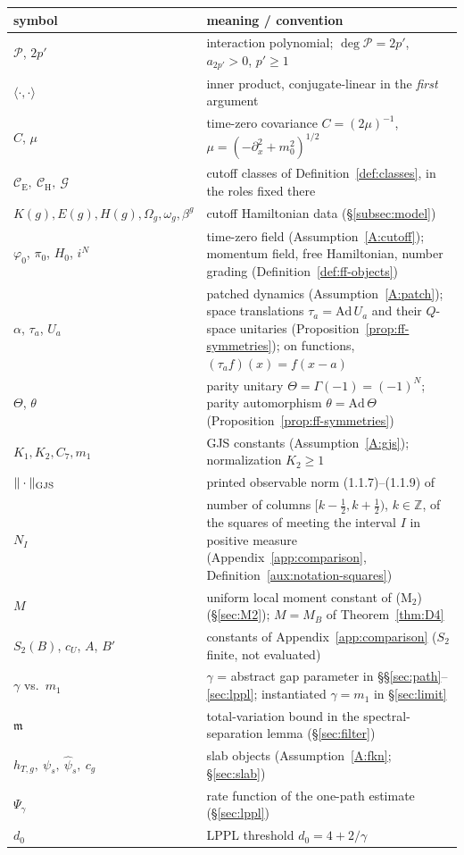 \documentclass[11pt,a4paper]{article}
\theoremstyle{plain}
\theoremstyle{definition}
\theoremstyle{plain}
\theoremstyle{definition}
\newcommand{\Z}{\mathbb{Z}}
\newcommand{\G}{\mathcal{G}}
\newcommand{\CE}{\mathcal{C}_{\mathrm E}}
\newcommand{\CH}{\mathcal{C}_{\mathrm H}}
\newcommand{\Om}{\Omega}
\newcommand{\ip}[2]{\langle #1,#2\rangle}
\begin{document}
\begin{center}
\small
\begin{tabular}{l p{}}
\toprule
symbol & meaning / convention\\
\midrule
$\mathscr P$, $2p'$ & interaction polynomial; $\deg\mathscr P=2p'$, $a_{2p'}>0$, $p'\ge1$\\
$\ip{\cdot}{\cdot}$ & inner product, conjugate-linear in the \emph{first} argument\\
$C$, $\mu$ & time-zero covariance $C=(2\mu)^{-1}$, $\mu=(-\partial_x^2+m_0^2)^{1/2}$\\
$\CE,\ \CH,\ \G$ & cutoff classes of Definition~\ref{def:classes}, in the roles fixed there\\
$K(g),E(g),H(g),\Om_g,\omega_g,\beta^g$ & cutoff Hamiltonian data (\S\ref{subsec:model})\\
$\varphi_0$, $\pi_0$, $H_0$, $i^N$ & time-zero field (Assumption~\ref{A:cutoff}); momentum field, free Hamiltonian, number grading (Definition~\ref{def:ff-objects})\\
$\alpha$, $\tau_a$, $U_a$ & patched dynamics (Assumption~\ref{A:patch}); space translations $\tau_a=\mathrm{Ad}\,U_a$ and their $Q$-space unitaries (Proposition~\ref{prop:ff-symmetries}); on functions, $(\tau_af)(x)=f(x-a)$\\
$\Theta$, $\theta$ & parity unitary $\Theta=\Gamma(-1)=(-1)^N$; parity automorphism $\theta=\mathrm{Ad}\,\Theta$ (Proposition~\ref{prop:ff-symmetries})\\
$K_1,K_2,C_7,m_1$ & GJS constants (Assumption~\ref{A:gjs}); normalization $K_2\ge1$\\
$\|\cdot\|_{\rm GJS}$ & printed observable norm (1.1.7)--(1.1.9) of \cite{GJS}\\
$N_I$ & number of columns $[k-\frac12,k+\frac12)$, $k\in\Z$, of the squares of \cite[p.~593]{GJS} meeting the interval $I$ in positive measure (Appendix~\ref{app:comparison}, Definition~\ref{aux:notation-squares})\\
$M$ & uniform local moment constant of (M$_2$) (\S\ref{sec:M2}); $M=M_B$ of Theorem~\ref{thm:D4}\\
$S_2(B)$, $c_U$, $A$, $B'$ & constants of Appendix~\ref{app:comparison} ($S_2$ finite, not evaluated)\\
$\gamma$ vs.\ $m_1$ & $\gamma$ = abstract gap parameter in \S\S\ref{sec:path}--\ref{sec:lppl}; instantiated $\gamma=m_1$ in \S\ref{sec:limit}\\
$\mathfrak m$ & total-variation bound in the spectral-separation lemma (\S\ref{sec:filter})\\
$h_{T,g},\ \psi_s,\ \hat\psi_s,\ c_g$ & slab objects (Assumption~\ref{A:fkn}; \S\ref{sec:slab})\\
$\Psi_\gamma$ & rate function of the one-path estimate (\S\ref{sec:lppl})\\
$d_0$ & LPPL threshold $d_0=4+2/\gamma$\\
\bottomrule
\end{tabular}
\end{center}
\end{document}
